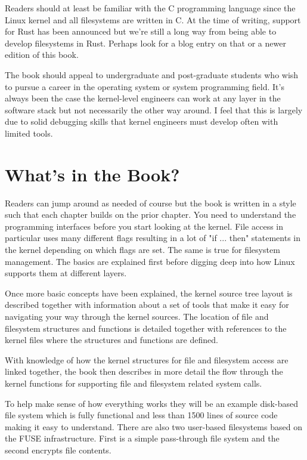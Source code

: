 Readers should at least be familiar with the C programming language since the Linux kernel and all filesystems are written in C. At the time of writing, support for Rust has been announced but we're still a long way from being able to develop filesystems in Rust. Perhaps look for a blog entry on that or a newer edition of this book.

The book should appeal to undergraduate and post-graduate students who wish to pursue a career in the operating system or system programming field. It's always been the case the kernel-level engineers can work at any layer in the software stack but not necessarily the other way around. I feel that this is largely due to solid debugging skills that kernel engineers must develop often with limited tools.


\section{What's in the Book?}

Readers can jump around as needed of course but the book is written in a style such that each chapter builds on the prior chapter. You need to understand the programming interfaces before you start looking at the kernel. File access in particular uses many different flags resulting in a lot of "if ... then" statements in the kernel depending on which flags are set. The same is true for filesystem management. The basics are explained first before digging deep into how Linux supports them at different layers.

Once more basic concepts have been explained, the kernel source tree layout is described together with information about a set of tools that make it easy for navigating your way through the kernel sources. The location of file and filesystem structures and functions is detailed together with references to the kernel files where the structures and functions are defined.

With knowledge of how the kernel structures for file and filesystem access are linked together, the book then describes in more detail the flow through the kernel functions for supporting file and filesystem related system calls.

To help make sense of how everything works they will be an example disk-based file system which is fully functional and less than 1500 lines of source code making it easy to understand. There are also two user-based filesystems based on the FUSE infrastructure. First is a simple pass-through file system and the second encrypts file contents.


